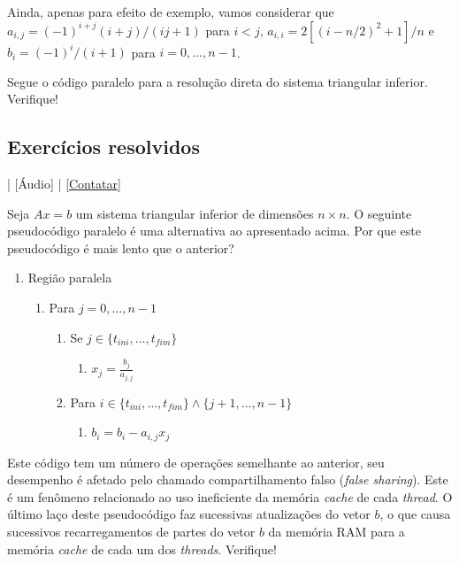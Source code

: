 Ainda, apenas para efeito de exemplo, vamos considerar que $a_{i,j} = (-1)^{i+j}(i+j)/(ij+1)$ para $i<j$, $a_{i,i} = 2[(i-n/2)^2+1]/n$ e $b_i = (-1)^i/(i+1)$ para $i=0,\dotsc,n-1$.

Segue o código paralelo para a resolução direta do sistema triangular inferior. Verifique!



\subsection*{Exercícios resolvidos}

\begin{flushright}
  [Vídeo] | [Áudio] | \href{https://phkonzen.github.io/notas/contato.html}{[Contatar]}
\end{flushright}

\begin{exeresol}\label{exeresol:mp_sistria_1drow}
  Seja $Ax = b$ um sistema triangular inferior de dimensões $n\times n$. O seguinte pseudocódigo paralelo é uma alternativa ao apresentado acima. Por que este pseudocódigo é mais lento que o anterior?
  \begin{enumerate}
  \item Região paralela
    \begin{enumerate}
    \item Para $j = 0,\dotsc,n-1$
      \begin{enumerate}
      \item Se $j\in\{t_{ini},\dotsc,t_{fim}\}$
        \begin{enumerate}
        \item $\displaystyle x_j = \frac{b_j}{a_{j,j}}$
        \end{enumerate}
      \item Para $i\in\{t_{ini},\dotsc,t_{fim}\}\land\{j+1,\dotsc,n-1\}$
        \begin{enumerate}
        \item $b_i = b_i - a_{i,j}x_j$
        \end{enumerate}
      \end{enumerate}
    \end{enumerate}
  \end{enumerate}
\end{exeresol}
\begin{resol}
  Este código tem um número de operações semelhante ao anterior, seu desempenho é afetado pelo chamado compartilhamento falso ({\it false sharing}). Este é um fenômeno relacionado ao uso ineficiente da memória {\it cache} de cada {\it thread}. O último laço deste pseudocódigo faz sucessivas atualizações do vetor $b$, o que causa sucessivos recarregamentos de partes do vetor $b$ da memória RAM para a memória {\it cache} de cada um dos {\it threads}. Verifique!
\end{resol}

